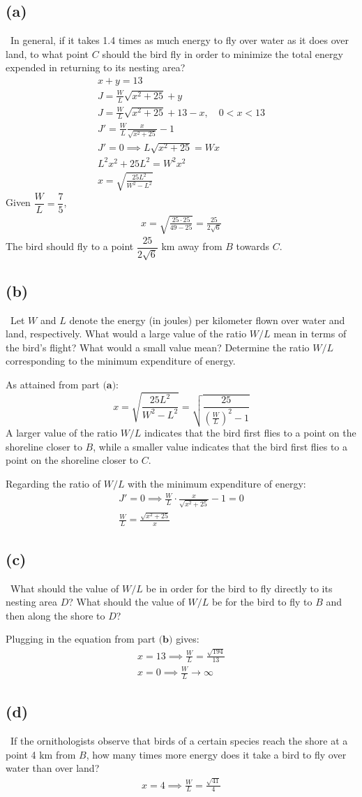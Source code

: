 \documentclass[12pt]{article}
\newcommand{\vem}{\vspace{0.5em}}
\newcommand{\subproblem}[1]{\subsection{(#1)} \,}
\begin{document}
\subproblem{a}
In general, if it takes 1.4 times as much energy to fly over water as it does over land, to what point
$C$ should the bird fly in order to minimize the total energy expended in returning to its nesting area?
\begin{gather*}
    x+y=13\\
    J=\frac{W}{L}\sqrt{x^2+25}+y\\
    J=\frac{W}{L}\sqrt{x^2+25}+13-x,\quad 0<x<13\\
    J'=\frac{W}{L}\frac{x}{\sqrt{x^2+25}}-1\\
    J'=0 \implies L\sqrt{x^2+25}=Wx\\
    L^2x^2+25L^2=W^2x^2\\
    \boxed{x=\sqrt{\frac{25L^2}{W^2-L^2}}}
\end{gather*}
Given $\dfrac{W}{L}=\dfrac{7}{5}$,
\begin{gather*}
    x=\sqrt{\frac{25\cdot 25}{49-25}}=\boxed{\frac{25}{2\sqrt{6}}}
\end{gather*}
The bird should fly to a point $\dfrac{25}{2\sqrt{6}}$ km away from $B$ towards $C$.

\subproblem{b}
Let $W$ and $L$ denote the energy (in joules) per kilometer flown over water and land, respectively.
What would a large value of the ratio $W/L$ mean in terms of the bird’s flight? What would a small value
mean? Determine the ratio $W/L$ corresponding to the minimum expenditure of energy. \vem

As attained from part $\textbf{(a)}$:
\[
x=\sqrt{\frac{25L^2}{W^2-L^2}}=\sqrt{\frac{25}{(\frac{W}{L})^2-1}}
\]
A larger value of the ratio $W/L$ indicates that the bird first flies to a point on the shoreline closer to $B$, while a smaller value indicates that the bird first flies to a point on the shoreline closer to $C$. \vem

Regarding the ratio of $W/L$ with the minimum expenditure of energy:
\begin{gather*}
    J'=0 \implies \frac{W}{L}\cdot \frac{x}{\sqrt{x^2+25}}-1=0\\
    \boxed{\frac{W}{L}=\frac{\sqrt{x^2+25}}{x}}
\end{gather*}

\subproblem{c}
What should the value of $W/L$ be in order for the bird to fly directly to its nesting area $D$? What
should the value of $W/L$ be for the bird to fly to $B$ and then along the shore to $D$? \vem

Plugging in the equation from part $\textbf{(b)}$ gives:
\begin{gather*}
    x=13 \implies \boxed{\frac{W}{L}=\frac{\sqrt{194}}{13}}\\
    x=0 \implies \boxed{\frac{W}{L} \to \infty}
\end{gather*}

\subproblem{d}
If the ornithologists observe that birds of a certain species reach the shore at a point 4 km from $B$,
how many times more energy does it take a bird to fly over water than over land?
\begin{gather*}
    x=4 \implies \boxed{\frac{W}{L}=\frac{\sqrt{41}}{4}}
\end{gather*}
\end{document}
